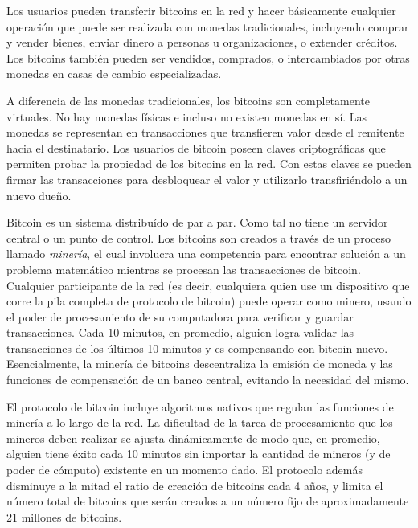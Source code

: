Los usuarios pueden transferir bitcoins en la red y hacer básicamente cualquier operación que puede ser
realizada con monedas tradicionales, incluyendo comprar y vender bienes, enviar dinero a personas u
organizaciones, o extender créditos. Los bitcoins también pueden ser vendidos, comprados, o intercambiados por
otras monedas en casas de cambio especializadas.

A diferencia de las monedas tradicionales, los bitcoins son completamente virtuales. No hay monedas
físicas e incluso no existen monedas en sí. Las monedas se representan en transacciones que transfieren
valor desde el remitente hacia el destinatario. Los usuarios de bitcoin poseen claves criptográficas
que permiten probar la propiedad de los bitcoins en la red. Con estas claves se pueden firmar las
transacciones para desbloquear el valor y utilizarlo transfiriéndolo a un nuevo dueño. 

Bitcoin es un sistema distribuído de par a par. Como tal no tiene un servidor central o un punto de control.
Los bitcoins son creados a través de un proceso llamado \textit{minería}, el cual involucra una competencia
para encontrar solución a un problema matemático mientras se procesan las transacciones de bitcoin.
Cualquier participante de la red (es decir, cualquiera quien use un dispositivo que corre la pila
completa de protocolo de bitcoin) puede operar como minero, usando el poder de procesamiento de su
computadora para verificar y guardar transacciones. Cada 10 minutos, en promedio, alguien logra validar
las transacciones de los últimos 10 minutos y es compensando con bitcoin nuevo. Esencialmente, la minería
de bitcoins descentraliza la emisión de moneda y las funciones de compensación de un banco central, evitando
la necesidad del mismo.

El protocolo de bitcoin incluye algoritmos nativos que regulan las funciones de minería a lo largo de la
red. La dificultad de la tarea de procesamiento que los mineros deben realizar se ajusta dinámicamente
de modo que, en promedio, alguien tiene éxito cada 10 minutos sin importar la cantidad de mineros (y
de poder de cómputo) existente en un momento dado. El protocolo además disminuye a la mitad el ratio de creación
de bitcoins cada 4 años, y limita el número total de bitcoins que serán creados a un número fijo de
aproximadamente 21 millones de bitcoins.

